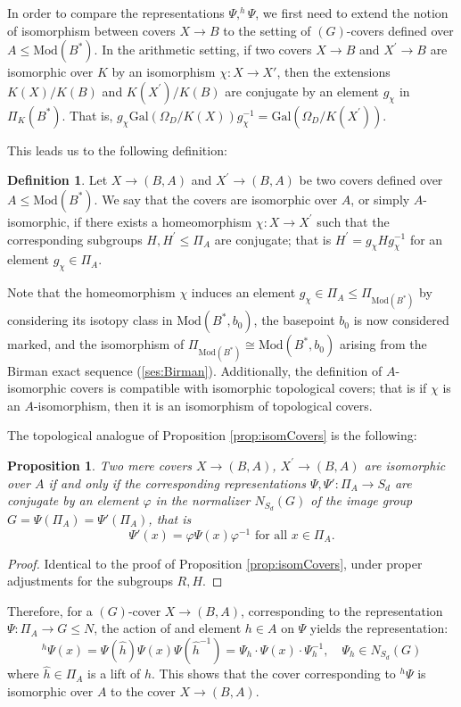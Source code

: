 \documentclass[10pt]{amsart}
\newtheorem{proposition}[theorem]{Proposition}
\theoremstyle{definition}
\newtheorem{definition}[theorem]{Definition}
\newcommand{\Gal}{{ \mathrm{Gal}}}
\begin{document}
In order to compare the representations $\Psi, ^h \! \Psi$, we first need to extend the notion of isomorphism between covers $X\to B$ to the setting of $(G)$-covers defined over $A \leq \mathrm{Mod}(B^*)$. In the arithmetic setting, if two covers $X\to B$ and $X^\prime \rightarrow B$ are isomorphic over $K$ by an isomorphism $\chi \colon X \to X'$, then the extensions $K(X)/K(B)$ and $K(X^\prime)/K(B)$ are conjugate by an element $g_\chi$ in $\Pi_K(B^*)$. That is, $g_\chi\Gal(\Omega_D/K(X))g_\chi^{-1} = \Gal(\Omega_D/K(X^\prime))$.

This leads us to the following definition:
\begin{definition}
Let $X \to (B,A)$ and $X^\prime\to (B,A)$ be two covers defined over $A\leq \mathrm{Mod}(B^*)$. We say that the covers are isomorphic over $A$, or simply $A$-isomorphic, if there exists a homeomorphism $\chi \colon X \to X^\prime$ such that the corresponding subgroups $H, H^\prime \leq \Pi_A$ are conjugate; that is $H^\prime = g_\chi H g_\chi^{-1}$ for an element $g_\chi \in \Pi_A$.
\end{definition}

Note that the homeomorphism $\chi$ induces an element $g_\chi \in \Pi_A \leq \Pi_{\mathrm{Mod}(B^*)}$ by considering its isotopy class in $\mathrm{Mod}(B^*,b_0)$, the basepoint $b_0$ is now considered marked, and the isomorphism of $\Pi_{\mathrm{Mod}(B^*)} \cong \mathrm{Mod}(B^*,b_0)$ arising from the Birman exact sequence (\ref{ses:Birman}). Additionally, the definition of $A$-isomorphic covers is compatible with isomorphic topological covers; that is if $\chi$ is an $A$-isomorphism, then it is an isomorphism of topological covers.

The topological analogue of Proposition \ref{prop:isomCovers} is the following: 
\begin{proposition}{\label{prop:isomCoversTop}}
  Two mere covers $X \rightarrow (B,A)$, $X^\prime \rightarrow (B,A)$ are isomorphic over $A$ if and only if the corresponding representations $\Psi,\Psi': \Pi_A \rightarrow S_d$ are conjugate by an element $\varphi$ in the normalizer $N_{S_d}(G)$ of the image group $G=\Psi(\Pi_A) = \Psi'(\Pi_A)$, that is
  \[
  \Psi'(x) = \varphi \Psi(x) \varphi^{-1} \text{ for all } x \in \Pi_A. 
\]

\end{proposition}
\begin{proof}
  Identical to the proof of Proposition \ref{prop:isomCovers}, under proper adjustments for the subgroups $R,H$.
\end{proof}
Therefore, for a $(G)$-cover $X\rightarrow (B,A)$, corresponding to the representation $\Psi:\Pi_A\rightarrow G\leq N$, the action of and element $h \in A$ on $\Psi$ yields the representation:
\[ 
^h  \Psi (x) = \Psi(\hat{h}) \Psi(x) \Psi(\hat{h}^{-1}) = \Psi_h \cdot \Psi(x) \cdot \Psi_h^{-1},  \quad  \Psi_h \in N_{S_d}(G)
\] 
where $\hat{h} \in \Pi_A$ is a lift of $h$. This shows that the cover corresponding to $^h \Psi$ is isomorphic over $A$ to the cover $X\rightarrow (B,A)$.  
\end{document}
